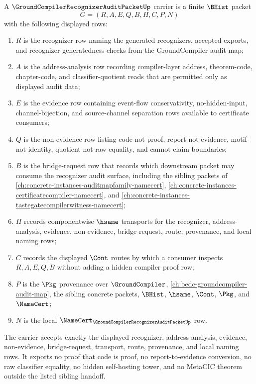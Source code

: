 \begin{definition}
\label{def:groundcompiler-recognizer-audit-packet-carrier}
A $\GroundCompilerRecognizerAuditPacketUp$ carrier is a finite $\BHist$ packet
$$
G=(R,A,E,Q,B,H,C,P,N)
$$
with the following displayed rows:
\begin{enumerate}
\item $R$ is the recognizer row naming the generated recognizers, accepted exports, and recognizer-generatedness checks from the GroundCompiler audit map;
\item $A$ is the address-analysis row recording compiler-layer address, theorem-code, chapter-code, and classifier-quotient reads that are permitted only as displayed audit data;
\item $E$ is the evidence row containing event-flow conservativity, no-hidden-input, channel-bijection, and source-channel separation rows available to certificate consumers;
\item $Q$ is the non-evidence row listing code-not-proof, report-not-evidence, motif-not-identity, quotient-not-raw-equality, and cannot-claim boundaries;
\item $B$ is the bridge-request row that records which downstream packet may consume the recognizer audit surface, including the sibling packets of \autoref{ch:concrete-instances-auditmapfamily-namecert}, \autoref{ch:concrete-instances-certificatecompiler-namecert}, and \autoref{ch:concrete-instances-tastegatecompilerwitness-namecert};
\item $H$ records componentwise $\hsame$ transports for the recognizer, address-analysis, evidence, non-evidence, bridge-request, route, provenance, and local naming rows;
\item $C$ records the displayed $\Cont$ routes by which a consumer inspects $R,A,E,Q,B$ without adding a hidden compiler proof row;
\item $P$ is the $\Pkg$ provenance over $\GroundCompiler$, \autoref{ch:bedc-groundcompiler-audit-map}, the sibling concrete packets, $\BHist$, $\hsame$, $\Cont$, $\Pkg$, and $\NameCert$;
\item $N$ is the local $\NameCert_{\GroundCompilerRecognizerAuditPacketUp}$ row.
\end{enumerate}
The carrier accepts exactly the displayed recognizer, address-analysis, evidence, non-evidence, bridge-request, transport, route, provenance, and local naming rows. It exports no proof that code is proof, no report-to-evidence conversion, no raw classifier equality, no hidden self-hosting tower, and no MetaCIC theorem outside the listed sibling handoff.
\end{definition}


